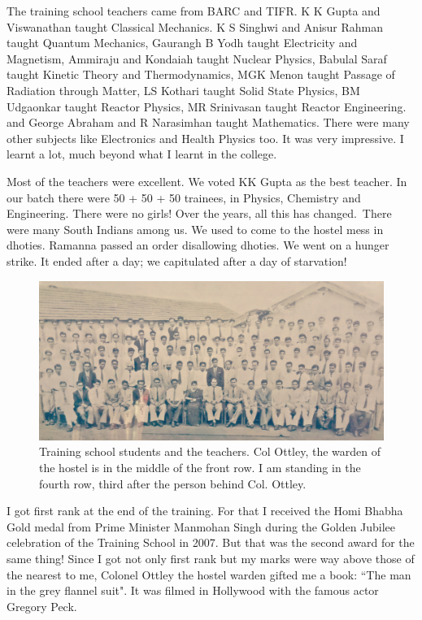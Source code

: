 The training school teachers came from BARC and TIFR. K K Gupta and 
Viswanathan taught Classical Mechanics. K S Singhwi and Anisur Rahman 
taught Quantum Mechanics, Gaurangh B Yo\-dh taught Electricity and 
Magnetism, Ammiraju and Kondaiah taught Nuclear Physics, Babulal Saraf 
taught Kinetic Theory and Thermodynamics, MGK Menon taught Passage of 
Radiation thro\-ugh Matter, LS Kothari taught Solid State Physics, BM 
Udgaonkar taught Reactor Physics, MR Srinivasan taught Reactor 
Enginee\-ring. and George Abraham and R Narasimhan taught Mathema\-tics. 
There were many other subjects like Electro\-nics and Health Physics too. 
It was very impressive. I learnt a lot, much beyond what I learnt in the 
colleg\-e.

Most of the teachers were excellent. We voted KK Gupta as the best teacher.
In our batch there were 50 + 50 + 50 trainees, in Physics, Chemistry
and Engineering. There were no girls! Over the years, all this has changed.\
There were many South Indians among us. We used to come to the hostel 
mess in dhoties. Ramanna passed an order disallowing dhoties. We went on 
a hunger strike. It ended after a day; we capitulated after a day of 
starvation!

\begin{figure}[H]
\centering
\includegraphics[width=1\textwidth]{images/new-images/06-Rajaji-TS.jpg}
\caption{\small{Training school students and the teachers. Col Ottley, the warden of the hostel is in the middle of the front row. I am standing in the fourth row, third after the person behind Col. Ottley.}}
\end{figure}

I got first rank at the end of the training. For that I received the 
Homi Bhabha Gold medal from Prime Minister Manmohan Singh during the 
Golden Jubilee celebration of the Training Sch\-ool in 2007. But that was 
the second award for the same thing! Since I got not only first rank but 
my marks were way above those of the nearest to me, Colonel Ottley the 
hostel warden gifted me a book: ``The man in the grey flannel suit". It 
was filmed in Hollywood with the famous actor Gregory Peck.
 
